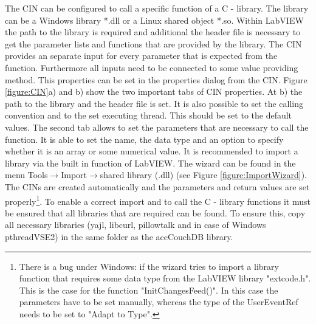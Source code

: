 The CIN can be configured to call a specific function of a C - library. The library can be a Windows library *.dll or a Linux shared object *.so. Within LabVIEW the path to the library is required and additional the header file is necessary to get the parameter lists and functions that are provided by the library. The CIN provides an separate input for every parameter that is expected from the function. Furthermore all inputs need to be connected to some value providing method. This properties can be set in the properties dialog from the CIN. Figure \ref{figure:CIN}a) and b) show the two important tabs of CIN properties. At b) the path to the library and the header file is set. It is also possible to set the calling convention and to the set executing thread. This should be set to the default values. The second tab allows to set the parameters that are necessary to call the function. It is able to set the name, the data type and an option to specify whether it is an array or some numerical value. It is recommended to import a library via the built in function of LabVIEW. The wizard can be found in the menu Tools$\rightarrow$Import$\rightarrow$shared library (.dll) (see Figure \ref{figure:ImportWizard}). The CINs are created automatically and the parameters and return values are set properly\footnote{There is a bug under Windows: if the wizard tries to import a library function that requires some data type from the LabVIEW library "extcode.h". This is the case for the function "InitChangesFeed()". In this case the parameters have to be set manually, whereas the type of the UserEventRef needs to be set to "Adapt to Type".}. To enable a correct import and to call the C - library functions it must be ensured that all libraries that are required can be found. To ensure this, copy all necessary libraries (yajl, libcurl, pillowtalk and in case of Windows pthreadVSE2) in the same folder as the accCouchDB library.

